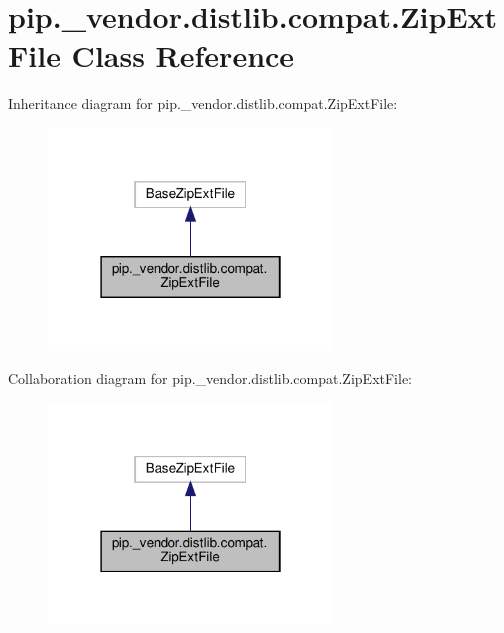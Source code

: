 \hypertarget{classpip_1_1__vendor_1_1distlib_1_1compat_1_1ZipExtFile}{}\section{pip.\+\_\+vendor.\+distlib.\+compat.\+Zip\+Ext\+File Class Reference}
\label{classpip_1_1__vendor_1_1distlib_1_1compat_1_1ZipExtFile}


Inheritance diagram for pip.\+\_\+vendor.\+distlib.\+compat.\+Zip\+Ext\+File\+:
\nopagebreak
\begin{figure}[H]
\begin{center}
\leavevmode
\includegraphics[width=214pt]{classpip_1_1__vendor_1_1distlib_1_1compat_1_1ZipExtFile__inherit__graph}
\end{center}
\end{figure}


Collaboration diagram for pip.\+\_\+vendor.\+distlib.\+compat.\+Zip\+Ext\+File\+:
\nopagebreak
\begin{figure}[H]
\begin{center}
\leavevmode
\includegraphics[width=214pt]{classpip_1_1__vendor_1_1distlib_1_1compat_1_1ZipExtFile__coll__graph}
\end{center}
\end{figure}
